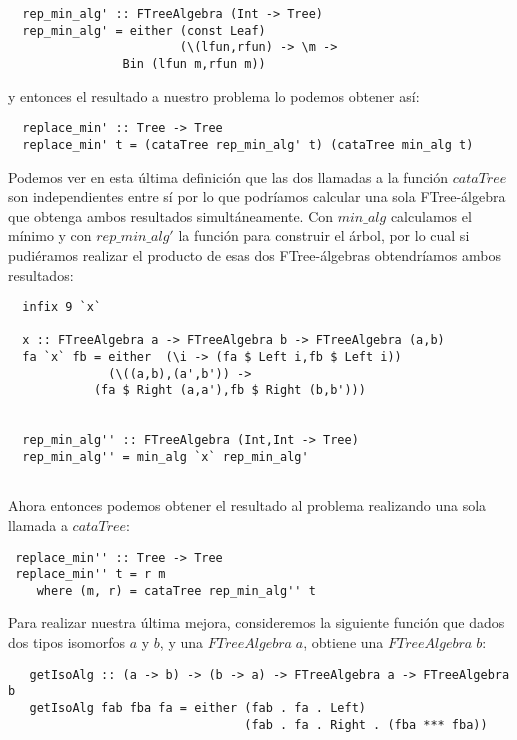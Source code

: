 \documentclass[a4paper,10pt]{article}
\begin{document}
\begin{lstlisting}
  rep_min_alg' :: FTreeAlgebra (Int -> Tree)
  rep_min_alg' = either (const Leaf) 
                        (\(lfun,rfun) -> \m -> 
			    Bin (lfun m,rfun m))
\end{lstlisting}

\noindent y entonces el resultado a nuestro problema lo podemos obtener así:

\begin{lstlisting}
  replace_min' :: Tree -> Tree
  replace_min' t = (cataTree rep_min_alg' t) (cataTree min_alg t) 
\end{lstlisting}

Podemos ver en esta última definición que las dos llamadas a la función $cataTree$ son independientes
entre sí por lo que podríamos calcular una sola FTree-álgebra que obtenga ambos resultados
simultáneamente. Con $min\_alg$ calculamos el mínimo y con $rep\_min\_alg'$ la función para construir
el árbol, por lo cual si pudiéramos realizar el producto de esas dos FTree-álgebras obtendríamos ambos
resultados:

\begin{lstlisting}
  infix 9 `x`

  x :: FTreeAlgebra a -> FTreeAlgebra b -> FTreeAlgebra (a,b)
  fa `x` fb = either  (\i -> (fa $ Left i,fb $ Left i))
		      (\((a,b),(a',b')) -> 
			(fa $ Right (a,a'),fb $ Right (b,b')))
			  

  rep_min_alg'' :: FTreeAlgebra (Int,Int -> Tree)
  rep_min_alg'' = min_alg `x` rep_min_alg'
  
\end{lstlisting}

  Ahora entonces podemos obtener el resultado al problema realizando una sola llamada
  a $cataTree$:
  
\begin{lstlisting}
 replace_min'' :: Tree -> Tree
 replace_min'' t = r m
    where (m, r) = cataTree rep_min_alg'' t
\end{lstlisting}

  Para realizar nuestra última mejora, consideremos la siguiente función que dados dos
  tipos isomorfos $a$ y $b$, y una $FTreeAlgebra\;a$, obtiene una $FTreeAlgebra\;b$:

  \begin{lstlisting}
   getIsoAlg :: (a -> b) -> (b -> a) -> FTreeAlgebra a -> FTreeAlgebra b
   getIsoAlg fab fba fa = either (fab . fa . Left)
                                 (fab . fa . Right . (fba *** fba))
  \end{lstlisting}
  
\end{document}
